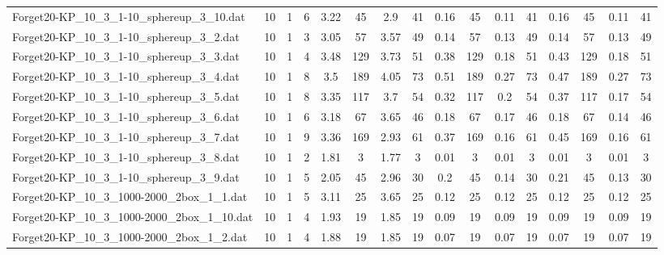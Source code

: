 \begin{sidewaystable}[!ht]
{\begin{tabular}{lccccccccccccccc}
Forget20-KP\_10\_3\_1-10\_sphereup\_3\_10.dat & 10 & 1 & 6 & 3.22 & 45 & 2.9 & 41 & 0.16 & 45 &  \textcolor{blue2}{0.11} & 41 & 0.16 & 45 &  \textcolor{blue2}{0.11} & 41 \\
Forget20-KP\_10\_3\_1-10\_sphereup\_3\_2.dat & 10 & 1 & 3 & 3.05 & 57 & 3.57 & 49 & 0.14 & 57 &  \textcolor{blue2}{0.13} & 49 & 0.14 & 57 &  \textcolor{blue2}{0.13} & 49 \\
Forget20-KP\_10\_3\_1-10\_sphereup\_3\_3.dat & 10 & 1 & 4 & 3.48 & 129 & 3.73 & 51 & 0.38 & 129 &  \textcolor{blue2}{0.18} & 51 & 0.43 & 129 &  \textcolor{blue2}{0.18} & 51 \\
Forget20-KP\_10\_3\_1-10\_sphereup\_3\_4.dat & 10 & 1 & 8 & 3.5 & 189 & 4.05 & 73 & 0.51 & 189 & 0.27 & 73 & 0.47 & 189 & 0.27 & 73 \\
Forget20-KP\_10\_3\_1-10\_sphereup\_3\_5.dat & 10 & 1 & 8 & 3.35 & 117 & 3.7 & 54 & 0.32 & 117 & 0.2 & 54 & 0.37 & 117 &  \textcolor{blue2}{0.17} & 54 \\
Forget20-KP\_10\_3\_1-10\_sphereup\_3\_6.dat & 10 & 1 & 6 & 3.18 & 67 & 3.65 & 46 & 0.18 & 67 & 0.17 & 46 & 0.18 & 67 &  \textcolor{blue2}{0.14} & 46 \\
Forget20-KP\_10\_3\_1-10\_sphereup\_3\_7.dat & 10 & 1 & 9 & 3.36 & 169 & 2.93 & 61 & 0.37 & 169 &  \textcolor{blue2}{0.16} & 61 & 0.45 & 169 &  \textcolor{blue2}{0.16} & 61 \\
Forget20-KP\_10\_3\_1-10\_sphereup\_3\_8.dat & 10 & 1 & 2 & 1.81 & 3 & 1.77 & 3 &  \textcolor{blue2}{0.01} & 3 &  \textcolor{blue2}{0.01} & 3 &  \textcolor{blue2}{0.01} & 3 &  \textcolor{blue2}{0.01} & 3 \\
Forget20-KP\_10\_3\_1-10\_sphereup\_3\_9.dat & 10 & 1 & 5 & 2.05 & 45 & 2.96 & 30 & 0.2 & 45 & 0.14 & 30 & 0.21 & 45 &  \textcolor{blue2}{0.13} & 30 \\
Forget20-KP\_10\_3\_1000-2000\_2box\_1\_1.dat & 10 & 1 & 5 & 3.11 & 25 & 3.65 & 25 &  \textcolor{blue2}{0.12} & 25 &  \textcolor{blue2}{0.12} & 25 &  \textcolor{blue2}{0.12} & 25 &  \textcolor{blue2}{0.12} & 25 \\
Forget20-KP\_10\_3\_1000-2000\_2box\_1\_10.dat & 10 & 1 & 4 & 1.93 & 19 & 1.85 & 19 &  \textcolor{blue2}{0.09} & 19 &  \textcolor{blue2}{0.09} & 19 &  \textcolor{blue2}{0.09} & 19 &  \textcolor{blue2}{0.09} & 19 \\
Forget20-KP\_10\_3\_1000-2000\_2box\_1\_2.dat & 10 & 1 & 4 & 1.88 & 19 & 1.85 & 19 &  \textcolor{blue2}{0.07} & 19 &  \textcolor{blue2}{0.07} & 19 &  \textcolor{blue2}{0.07} & 19 &  \textcolor{blue2}{0.07} & 19 \\

\end{tabular}}
\end{sidewaystable}
